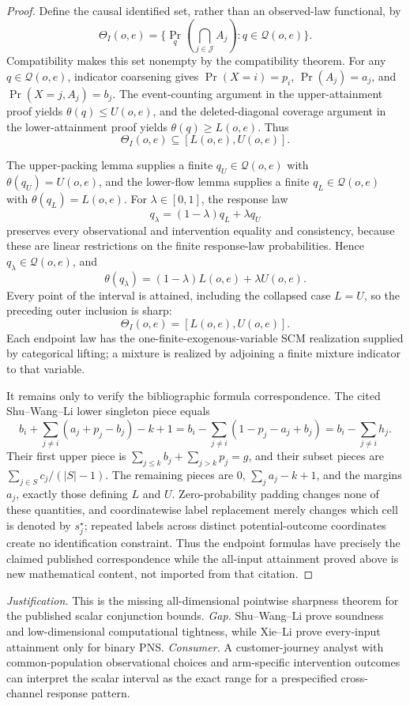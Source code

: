 \documentclass{article}
\begin{document}
\begin{proof}
Define the causal identified set, rather than an observed-law functional, by
\[
 \Theta_I(o,e)=\{\Pr_q(\bigcap_{j\in\mathcal J}A_j):q\in\mathcal Q(o,e)\}.
\]
Compatibility makes this set nonempty by the compatibility theorem.  For any \(q\in\mathcal Q(o,e)\), indicator coarsening gives \(\Pr(X=i)=p_i\), \(\Pr(A_j)=a_j\), and \(\Pr(X=j,A_j)=b_j\).  The event-counting argument in the upper-attainment proof yields \(\theta(q)\leq U(o,e)\), and the deleted-diagonal coverage argument in the lower-attainment proof yields \(\theta(q)\geq L(o,e)\).  Thus
\[
 \Theta_I(o,e)\subseteq[L(o,e),U(o,e)].
\]

The upper-packing lemma supplies a finite \(q_U\in\mathcal Q(o,e)\) with \(\theta(q_U)=U(o,e)\), and the lower-flow lemma supplies a finite \(q_L\in\mathcal Q(o,e)\) with \(\theta(q_L)=L(o,e)\).  For \(\lambda\in[0,1]\), the response law
\[
 q_\lambda=(1-\lambda)q_L+\lambda q_U
\]
preserves every observational and intervention equality and consistency, because these are linear restrictions on the finite response-law probabilities.  Hence \(q_\lambda\in\mathcal Q(o,e)\), and
\[
 \theta(q_\lambda)=(1-\lambda)L(o,e)+\lambda U(o,e).
\]
Every point of the interval is attained, including the collapsed case \(L=U\), so the preceding outer inclusion is sharp:
\[
 \Theta_I(o,e)=[L(o,e),U(o,e)].
\]
Each endpoint law has the one-finite-exogenous-variable SCM realization supplied by categorical lifting; a mixture is realized by adjoining a finite mixture indicator to that variable.

It remains only to verify the bibliographic formula correspondence.  The cited Shu--Wang--Li lower singleton piece equals
\[
 b_i+\sum_{j\ne i}(a_j+p_j-b_j)-k+1
 =b_i-\sum_{j\ne i}(1-p_j-a_j+b_j)
 =b_i-\sum_{j\ne i}h_j.
\]
Their first upper piece is \(\sum_{j\leq k}b_j+\sum_{j>k}p_j=g\), and their subset pieces are \(\sum_{j\in S}c_j/(|S|-1)\).  The remaining pieces are \(0\), \(\sum_ja_j-k+1\), and the margins \(a_j\), exactly those defining \(L\) and \(U\).  Zero-probability padding changes none of these quantities, and coordinatewise label replacement merely changes which cell is denoted by \(s_j^\star\); repeated labels across distinct potential-outcome coordinates create no identification constraint.  Thus the endpoint formulas have precisely the claimed published correspondence while the all-input attainment proved above is new mathematical content, not imported from that citation.
\end{proof}
\par\smallskip\noindent \textit{Justification.} This is the missing all-dimensional pointwise sharpness theorem for the published scalar conjunction bounds. \textit{Gap.} Shu--Wang--Li prove soundness and low-dimensional computational tightness, while Xie--Li prove every-input attainment only for binary PNS. \textit{Consumer.} A customer-journey analyst with common-population observational choices and arm-specific intervention outcomes can interpret the scalar interval as the exact range for a prespecified cross-channel response pattern.
\end{document}
